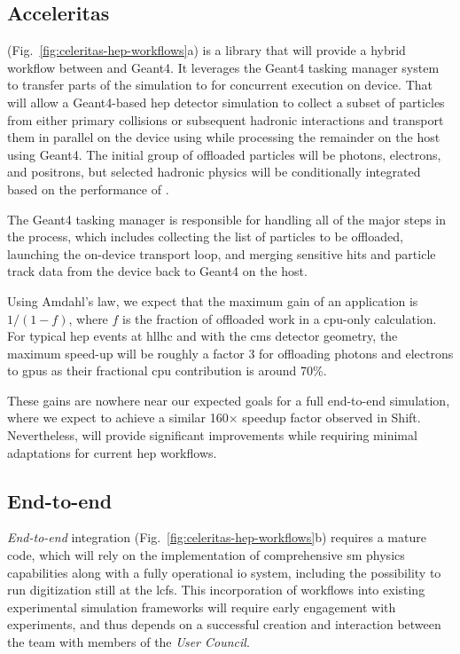 \subsection{Acceleritas}
\label{sec:acceleritas}

\acceleritas (Fig.~\ref{fig:celeritas-hep-workflows}a) is a library that will
provide a hybrid workflow between \celeritas and Geant4. It leverages the Geant4
tasking manager system to transfer parts of the simulation to \celeritas for
concurrent execution on device. That will allow a Geant4-based \ac{hep} detector
simulation to collect a subset of particles from either primary collisions or
subsequent hadronic interactions and transport them in parallel on the device
using \celeritas while processing the remainder on the host using Geant4.  The
initial group of offloaded particles will be photons, electrons, and positrons,
but selected hadronic physics will be conditionally integrated based on the
performance of \acceleritas.

The Geant4 tasking manager is responsible for handling all of the major steps in
the process, which includes collecting the list of particles to be offloaded,
launching the \celeritas on-device transport loop, and merging sensitive hits
and particle track data from the device back to Geant4 on the host.

Using Amdahl's law, we expect that the maximum gain of an \acceleritas
application is $1/(1-f)$, where $f$ is the fraction of offloaded work in a
\ac{cpu}-only calculation.  For typical \ac{hep} events at \acs{hllhc} and with
the \ac{cms} detector geometry, the maximum speed-up will be roughly a factor 3
for offloading photons and electrons to \acp{gpu} as their fractional \ac{cpu}
contribution is around 70\%.

These gains are nowhere near our expected goals for a full end-to-end \celeritas
simulation, where we expect \celeritas to achieve a similar 160$\times$ speedup
factor observed in Shift. Nevertheless, \acceleritas will provide significant
improvements while requiring minimal adaptations for current \ac{hep} workflows.

\subsection{End-to-end \celeritas}
\label{sec:end-to-end}

\emph{End-to-end} \celeritas integration
(Fig.~\ref{fig:celeritas-hep-workflows}b) requires a mature \celeritas code,
which will rely on the implementation of comprehensive \ac{sm} physics
capabilities along with a fully operational \ac{io} system, including the
possibility to run digitization still at the \acp{lcf}. This incorporation of
\celeritas workflows into existing experimental simulation frameworks will
require early engagement with experiments, and thus depends on a successful
creation and interaction between the \celeritas team with members of the
\emph{User Council}.

